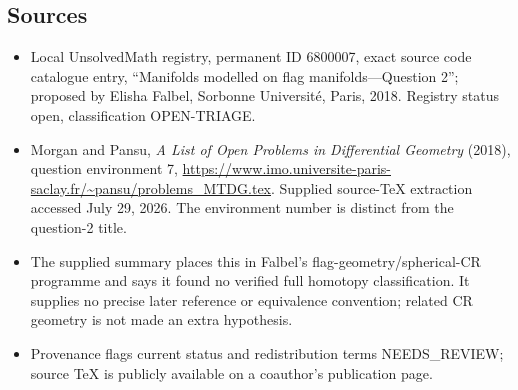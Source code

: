 \documentclass[11pt]{article}
\begin{document}
\subsection{Sources}
\begin{itemize}
\item Local UnsolvedMath registry, permanent ID 6800007, exact source code catalogue entry, ``Manifolds modelled on flag manifolds---Question 2''; proposed by Elisha Falbel, Sorbonne Universit\'e, Paris, 2018. Registry status open, classification OPEN-TRIAGE.
\item Morgan and Pansu, \emph{A List of Open Problems in Differential Geometry} (2018), question environment 7, \url{https://www.imo.universite-paris-saclay.fr/~pansu/problems_MTDG.tex}. Supplied source-TeX extraction accessed July 29, 2026. The environment number is distinct from the question-2 title.
\item The supplied summary places this in Falbel's flag-geometry/spherical-CR programme and says it found no verified full homotopy classification. It supplies no precise later reference or equivalence convention; related CR geometry is not made an extra hypothesis.
\item Provenance flags current status and redistribution terms NEEDS\_REVIEW; source TeX is publicly available on a coauthor's publication page.
\end{itemize}
\end{document}
